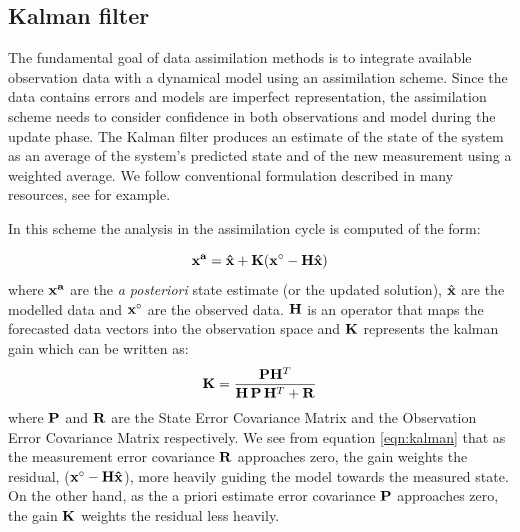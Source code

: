\documentclass[conference,compsoc]{IEEEtran}
\begin{document}
\subsection{Kalman filter}

The fundamental goal of data assimilation methods is to integrate available observation data with a dynamical model using an assimilation scheme. Since the data contains errors and models are imperfect representation, the assimilation scheme needs to consider confidence in both observations and model during the update phase. The Kalman filter produces an estimate of the state of the system as an average of the system's predicted state and of the new measurement using a weighted average. We follow conventional formulation described in many resources, see \cite{Welch06} for example.

In this scheme the analysis in the assimilation cycle is computed of the form:

\newcommand{\xest}[1]{{{\hat{\bf x}}_{#1}}}
\newcommand{\myK}{{{\bf K}}}
\newcommand{\myy}[1]{{{\bf y}_{#1}}}
\newcommand{\myHt}{{{\bf H}^T}}
\newcommand{\myH}{{{\bf H}}}
\newcommand{\myS}{{{\bf S}}}
\newcommand{\myP}{{{\bf P}}}
\newcommand{\myR}{{{\bf R}}}





\begin{equation}
 \bf x^a = \hat{\bf x} + \bf K (\bf x^\circ - \bf H  \hat{\bf x} )
\end{equation}
where $\bf x^a$ are the \emph{a posteriori} state estimate (or the updated solution), 
 $\hat{\bf x}$ are the modelled data and $\bf x^\circ$ are the observed data. $\bf H$ is an operator that maps the forecasted data vectors into the observation space and
 $\bf K$ represents the kalman gain which can be written as:
\begin{equation}
\label{eqn:kalman}
\myK = \frac{\myP \myHt}{\myH\,\myP\,\myHt + \myR}
\end{equation}
where $\myP$ and $\myR$ are the State Error Covariance Matrix and the Observation Error Covariance Matrix respectively. We see from equation \ref{eqn:kalman} that as the measurement error covariance $\myR$ approaches zero, the gain weights the residual, ($\bf x^\circ - \bf H  \hat{\bf x}$), more heavily guiding the model towards the measured state. On the other hand, as the a priori estimate error covariance $\myP$ approaches zero, the gain $\myK$ weights the residual less heavily.
\end{document}
